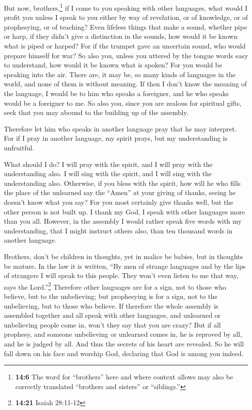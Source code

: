  But now, brothers,\footnote{\textbf{14:6} The word for
  ``brothers'' here and where context allows may also be correctly
  translated ``brothers and sisters'' or ``siblings.''} if I come to you
speaking with other languages, what would I profit you unless I speak to
you either by way of revelation, or of knowledge, or of prophesying, or
of teaching?  Even lifeless things that make a sound,
whether pipe or harp, if they didn't give a distinction in the sounds,
how would it be known what is piped or harped?  For if the
trumpet gave an uncertain sound, who would prepare himself for war?
 So also you, unless you uttered by the tongue words easy
to understand, how would it be known what is spoken? For you would be
speaking into the air.  There are, it may be, so many
kinds of languages in the world, and none of them is without meaning.
 If then I don't know the meaning of the language, I
would be to him who speaks a foreigner, and he who speaks would be a
foreigner to me.  So also you, since you are zealous for
spiritual gifts, seek that you may abound to the building up of the
assembly.

 Therefore let him who speaks in another language pray
that he may interpret.  For if I pray in another
language, my spirit prays, but my understanding is unfruitful.

 What should I do? I will pray with the spirit, and I
will pray with the understanding also. I will sing with the spirit, and
I will sing with the understanding also.  Otherwise, if
you bless with the spirit, how will he who fills the place of the
unlearned say the ``Amen'' at your giving of thanks, seeing he doesn't
know what you say?  For you most certainly give thanks
well, but the other person is not built up.  I thank my
God, I speak with other languages more than you all. 
However, in the assembly I would rather speak five words with my
understanding, that I might instruct others also, than ten thousand
words in another language.

 Brothers, don't be children in thoughts, yet in malice
be babies, but in thoughts be mature.  In the law it is
written, ``By men of strange languages and by the lips of strangers I
will speak to this people. They won't even listen to me that way, says
the Lord.''\footnote{\textbf{14:21} Isaiah 28:11-12} 
Therefore other languages are for a sign, not to those who believe, but
to the unbelieving; but prophesying is for a sign, not to the
unbelieving, but to those who believe.  If therefore the
whole assembly is assembled together and all speak with other languages,
and unlearned or unbelieving people come in, won't they say that you are
crazy?  But if all prophesy, and someone unbelieving or
unlearned comes in, he is reproved by all, and he is judged by all.
 And thus the secrets of his heart are revealed. So he
will fall down on his face and worship God, declaring that God is among
you indeed.

